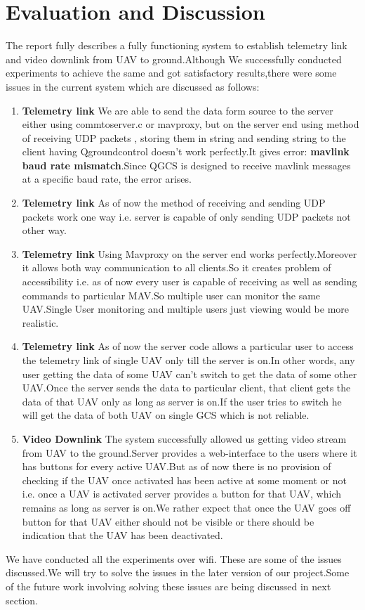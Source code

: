\documentclass[12pt]{article}
\begin{document}
\section{Evaluation and Discussion}
The report fully describes a fully functioning system to establish telemetry link and video downlink from UAV to ground.Although We successfully conducted experiments to achieve the same and got satisfactory results,there were some issues in the current system which are discussed as follows:
\begin{enumerate}
\item {\bf Telemetry link} We are able to send the data form source to the server either using commtoserver.c or mavproxy, but on the server end using method of receiving UDP packets , storing them in string and sending string to the client having Qgroundcontrol doesn't work perfectly.It gives error: {\bf mavlink baud rate mismatch}.Since QGCS is designed to receive mavlink messages at a specific baud rate, the error arises.
\item {\bf Telemetry link} As of now the method of receiving and sending UDP packets work one way i.e. server is capable of only sending UDP packets not other way.
\item {\bf Telemetry link} Using Mavproxy on the server end works perfectly.Moreover it allows both way communication to all clients.So it creates problem of accessibility i.e. as of now every user is capable of receiving as well as sending commands to particular MAV.So multiple user can monitor the same UAV.Single User monitoring and multiple users just viewing would be more realistic.
\item {\bf Telemetry link} As of now the server code allows a particular user to access the telemetry link of single UAV only till the server is on.In other words, any user getting the data of some UAV can't switch to get the data of some other UAV.Once the server sends the data to particular client, that client gets the data of that UAV only as long as server is on.If the user tries to switch he will get the data of both UAV on single GCS which is not reliable. 
\item {\bf Video Downlink} The system successfully allowed us getting video stream from UAV to the ground.Server provides a web-interface to the users where it has buttons for every active UAV.But as of now there is no provision of checking if the UAV once activated has been active at some moment or not i.e. once a UAV is activated server provides a button for that UAV, which remains as long as server is on.We rather expect that once the UAV goes off button for that UAV either should not be visible or there should be indication that the UAV has been deactivated.
\end{enumerate}
We have conducted all the experiments over wifi.
These are some of the issues discussed.We will try to solve the issues in the later version of our project.Some of the future work involving solving these issues are being discussed in next section.
\end{document}
